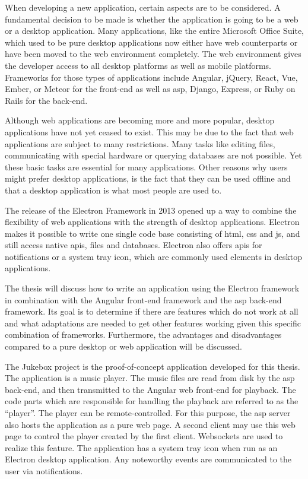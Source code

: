 
When developing a new application, certain aspects are to be considered. A fundamental decision to be made is whether the application is going to be a web or a desktop application. Many applications, like the entire Microsoft Office Suite, which used to be pure desktop applications now either have web counterparts or have been moved to the web environment completely. The web environment gives the developer access to all desktop platforms as well as mobile platforms. Frameworks for those types of applications include Angular, jQuery, React, Vue, Ember, or Meteor for the front-end as well as \gls{asp}, Django, Express, or Ruby on Rails for the back-end.

Although web applications are becoming more and more popular, desktop applications have not yet ceased to exist. This may be due to the fact that web applications are subject to many restrictions. Many tasks like editing files, communicating with special hardware or querying databases are not possible. Yet these basic tasks are essential for many applications. Other reasons why users might prefer desktop applications, is the fact that they can be used offline and that a desktop application is what most people are used to.

The release of the Electron Framework in 2013 opened up a way to combine the flexibility of web applications with the strength of desktop applications. Electron makes it possible to write one single code base consisting of \gls{html}, \gls{css} and \gls{js}, and still access native \glspl{api}, files and databases. Electron also offers \glspl{api} for notifications or a system tray icon, which are commonly used elements in desktop applications.

The thesis will discuss how to write an application using the Electron framework in combination with the Angular front-end framework and the \gls{asp} back-end framework. Its goal is to determine if there are features which do not work at all and what adaptations are needed to get other features working given this specific combination of frameworks. Furthermore, the advantages and disadvantages compared to a pure desktop or web application will be discussed.


The Jukebox project is the proof-of-concept application developed for this thesis. The application is a music player. The music files are read from disk by the \gls{asp} back-end, and then transmitted to the Angular web front-end for playback. The code parts which are responsible for handling the playback are referred to as the \enquote{player}. The player can be remote-controlled. For this purpose, the \gls{asp} server also hosts the application as a pure web page. A second client may use this web page to control the player created by the first client. Websockets are used to realize this feature. The application has a system tray icon when run as an Electron desktop application. Any noteworthy events are communicated to the user via notifications.

